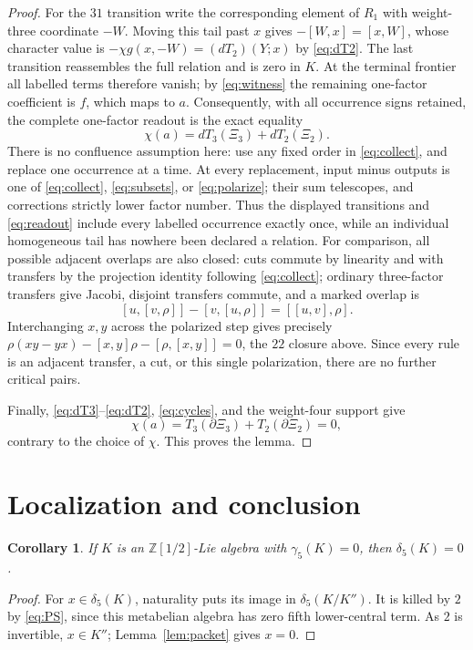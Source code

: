 \documentclass[10pt,a4paper]{amsart}
\newtheorem{corollary}[theorem]{Corollary}
\theoremstyle{remark}
\newcommand{\R}{\mathbb Z[1/2]}
\begin{document}
\begin{proof}
For the $31$ transition write the corresponding element of $R_1$ with
weight-three coordinate $-W$.  Moving this tail past $x$ gives
$-[W,x]=[x,W]$, whose character value is
$-\chi g(x,-W)=(dT_2)(Y;x)$ by \eqref{eq:dT2}.  The last transition
reassembles the full relation and is zero in $K$.  At the terminal
frontier all labelled terms therefore vanish; by
\eqref{eq:witness} the remaining one-factor coefficient is $f$, which
maps to $a$.  Consequently, with all occurrence signs retained,
the complete one-factor readout is the exact equality
\begin{equation}
             \chi(a)=dT_3(\Xi_3)+dT_2(\Xi_2).          \label{eq:readout}
\end{equation}
There is no confluence assumption here: use any fixed order in
\eqref{eq:collect},
and replace one occurrence at a time.  At every replacement, input
minus outputs is one of \eqref{eq:collect}, \eqref{eq:subsets}, or
\eqref{eq:polarize}; their sum
telescopes, and corrections strictly lower factor number.  Thus
the displayed transitions and \eqref{eq:readout} include every
labelled occurrence exactly once, while an
individual homogeneous tail has nowhere been declared a relation.
For comparison, all possible adjacent overlaps are also closed:
cuts commute by linearity and with transfers by the projection identity
following \eqref{eq:collect}; ordinary three-factor transfers give
Jacobi, disjoint transfers commute, and a marked overlap is
\[
 [u,[v,\rho]]-[v,[u,\rho]]=[[u,v],\rho].
\]
Interchanging $x,y$ across the polarized step gives precisely
$\rho(xy-yx)-[x,y]\rho-[\rho,[x,y]]=0$, the $22$ closure above.
Since every rule is an adjacent transfer, a cut, or this single
polarization, there are no further critical pairs.

Finally, \eqref{eq:dT3}--\eqref{eq:dT2}, \eqref{eq:cycles}, and the
weight-four support give
\[
 \chi(a)=T_3(\partial\Xi_3)+T_2(\partial\Xi_2)=0,
\]
contrary to the choice of $\chi$.  This proves the lemma.
\end{proof}

\section{Localization and conclusion}

\begin{corollary}\label{cor:class4}
If $K$ is an $\R$-Lie algebra with $\gamma_5(K)=0$, then
$\delta_5(K)=0$.
\end{corollary}

\begin{proof}
For $x\in\delta_5(K)$, naturality puts its image in
$\delta_5(K/K'')$.  It is killed by $2$ by \eqref{eq:PS}, since this
metabelian algebra has zero fifth lower-central term.
As $2$ is invertible, $x\in K''$; Lemma~\ref{lem:packet} gives $x=0$.
\end{proof}
\end{document}
